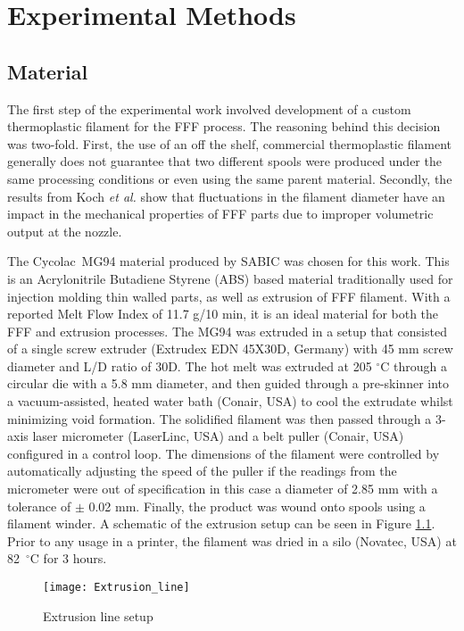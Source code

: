 \documentclass[main.tex]{subfiles}
\begin{document}
\chapter{Experimental Methods} \label{ch:exp}
\section{Material} \label{sec:material}

The first step of the experimental work involved development of a custom thermoplastic filament for the FFF process. The reasoning behind this decision was two-fold. First, the use of an off the shelf, commercial thermoplastic filament generally does not guarantee that two different spools were produced under the same processing conditions \textemdash or even using the same parent material. Secondly, the results from Koch \emph{et al.} \cite{Koch2017} show that fluctuations in the filament diameter have an impact in the mechanical properties of FFF parts due to improper volumetric output at the nozzle.

The Cycolac\texttrademark~MG94 material produced by SABIC was chosen for this work. This is an Acrylonitrile Butadiene Styrene (ABS) based material traditionally used for injection molding thin walled parts, as well as extrusion of FFF filament. With a reported Melt Flow Index of 11.7 g/10 min, it is an ideal material for both the FFF and extrusion processes. The MG94 was extruded in a setup that consisted of a single screw extruder (Extrudex EDN 45X30D, Germany) with 45 mm screw diameter and L/D ratio of 30D. The hot melt was extruded at 205 $^\circ$C through a circular die with a 5.8 mm diameter, and then guided through a pre-skinner into a vacuum-assisted, heated water bath (Conair, USA) to cool the extrudate whilst minimizing void formation. The solidified filament was then passed through a 3-axis laser micrometer (LaserLinc, USA) and a belt puller (Conair, USA) configured in a control loop. The dimensions of the filament were controlled by automatically adjusting the speed of the puller if the readings from the micrometer were out of specification \textemdash in this case a diameter of 2.85 mm with a tolerance of $\pm$ 0.02 mm. Finally, the product was wound onto spools using a filament winder. A schematic of the extrusion setup can be seen in Figure \ref{fig:extrLine}. Prior to any usage in a printer, the filament was dried in a silo (Novatec, USA) at 82~$^\circ$C for 3 hours.

\begin{figure}[h]
	\center
	\texttt{[image: Extrusion\_line]}
	\caption{Extrusion line setup} \label{fig:extrLine}
\end{figure}
\pagebreak
\end{document}
